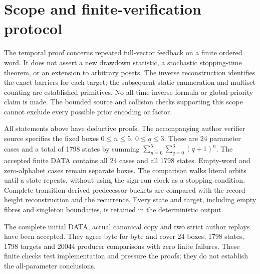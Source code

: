 \section{Scope and finite-verification protocol}

The temporal proof concerns repeated full-vector feedback on a finite
ordered word. It does not assert a new drawdown statistic, a stochastic
stopping-time theorem, or an extension to arbitrary posets. The inverse
reconstruction identifies the exact barriers for each target; the
subsequent static enumeration and multiset counting are established
primitives. No all-time inverse formula or global priority claim is made.
The bounded source and collision checks supporting this scope cannot
exclude every possible prior encoding or factor.

All statements above have deductive proofs. The accompanying author
verifier source specifies the fixed boxes $0\le n\le5$, $0\le q\le3$.
These are 24 parameter cases and a total of 1798 states by summing
$\sum_{n=0}^{5}\sum_{q=0}^{3}(q+1)^n$. The accepted finite DATA contains
all 24 cases and all 1798 states. Empty-word and zero-alphabet cases remain
separate boxes. The comparison walks literal orbits until a
state repeats, without using the sign-run clock as a stopping condition.
Complete transition-derived predecessor buckets are compared with the
record-height reconstruction and the recurrence. Every state and target,
including empty fibres and singleton boundaries, is retained in the
deterministic output.

The complete initial DATA, actual canonical copy and two strict author
replays have been accepted. They agree byte for byte and cover 24 boxes,
1798 states, 1798 targets and 20044 producer comparisons with zero finite
failures. These finite checks test implementation and pressure the proofs;
they do not establish the all-parameter conclusions.
